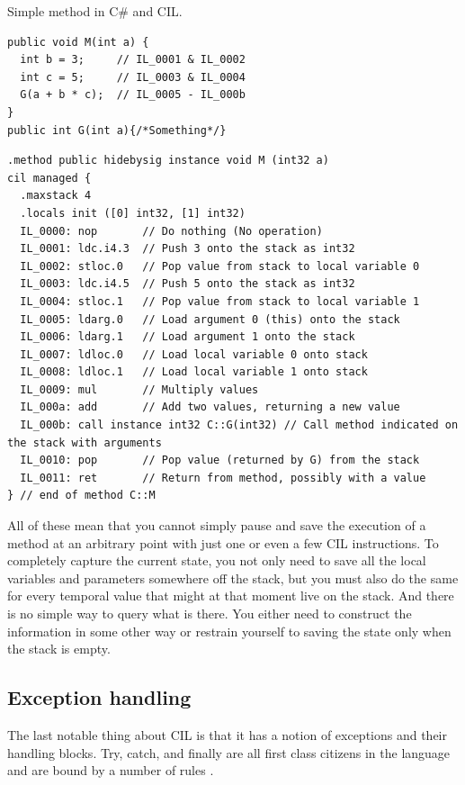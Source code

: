 \begin{listing}[h]
	\caption{Simple method in C\# and CIL.}
	\label{list2.1}
\begin{verbatim}
public void M(int a) {
  int b = 3;     // IL_0001 & IL_0002
  int c = 5;     // IL_0003 & IL_0004   
  G(a + b * c);  // IL_0005 - IL_000b
}
public int G(int a){/*Something*/}
\end{verbatim}
\begin{verbatim}
.method public hidebysig instance void M (int32 a) 
cil managed {
  .maxstack 4
  .locals init ([0] int32, [1] int32)
  IL_0000: nop       // Do nothing (No operation)
  IL_0001: ldc.i4.3  // Push 3 onto the stack as int32
  IL_0002: stloc.0   // Pop value from stack to local variable 0
  IL_0003: ldc.i4.5  // Push 5 onto the stack as int32
  IL_0004: stloc.1   // Pop value from stack to local variable 1
  IL_0005: ldarg.0   // Load argument 0 (this) onto the stack
  IL_0006: ldarg.1   // Load argument 1 onto the stack
  IL_0007: ldloc.0   // Load local variable 0 onto stack
  IL_0008: ldloc.1   // Load local variable 1 onto stack
  IL_0009: mul       // Multiply values
  IL_000a: add       // Add two values, returning a new value
  IL_000b: call instance int32 C::G(int32) // Call method indicated on the stack with arguments
  IL_0010: pop       // Pop value (returned by G) from the stack
  IL_0011: ret       // Return from method, possibly with a value
} // end of method C::M
\end{verbatim}
\end{listing}

All of these mean that you cannot simply pause and save the execution of a method at an arbitrary point with just one or even a few CIL instructions. To completely capture the current state, you not only need to save all the local variables and parameters somewhere off the stack, but you must also do the same for every temporal value that might at that moment live on the stack. And there is no simple way to query what is there. You either need to construct the information in some other way or restrain yourself to saving the state only when the stack is empty.

\subsection{Exception handling}\label{CILExc}

The last notable thing about CIL is that it has a notion of exceptions and their handling blocks. Try, catch, and finally are all first class citizens in the language and are bound by a number of rules \citep[Sec. I.12.4]{CLIEcma}.

